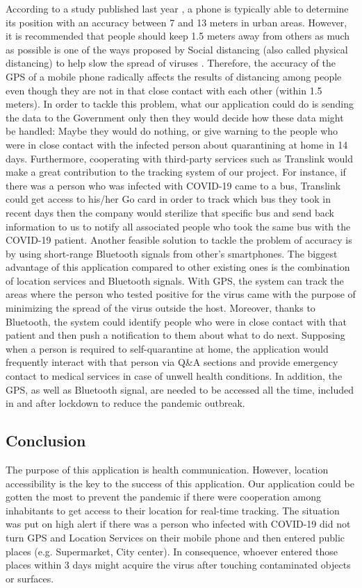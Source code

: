     \par According to a study published last year \parencite{Plan1}, a phone is typically able to determine its position with an accuracy between 7 and 13 meters in urban areas. However, it is recommended that people should keep 1.5 meters away from others as much as possible is one of the ways proposed by Social distancing (also called physical distancing) to help slow the spread of viruses \parencite{Plan2}. Therefore, the accuracy of the GPS of a mobile phone radically affects the results of distancing among people even though they are not in that close contact with each other (within 1.5 meters). In order to tackle this problem, what our application could do is sending the data to the Government only then they would decide how these data might be handled: Maybe they would do nothing, or give warning to the people who were in close contact with the infected person about quarantining at home in 14 days. Furthermore, cooperating with third-party services such as Translink would make a great contribution to the tracking system of our project. For instance, if there was a person who was infected with COVID-19 came to a bus, Translink could get access to his/her Go card in order to track which bus they took in recent days then the company would sterilize that specific bus and send back information to us to notify all associated people who took the same bus with the COVID-19 patient. Another feasible solution to tackle the problem of accuracy is by using short-range Bluetooth signals from other’s smartphones. The biggest advantage of this application compared to other existing ones is the combination of location services and Bluetooth signals. With GPS, the system can track the areas where the person who tested positive for the virus came with the purpose of minimizing the spread of the virus outside the host. Moreover, thanks to Bluetooth, the system could identify people who were in close contact with that patient and then push a notification to them about what to do next. Supposing when a person is required to self-quarantine at home, the application would frequently interact with that person via Q\&A sections and provide emergency contact to medical services in case of unwell health conditions. In addition, the GPS, as well as Bluetooth signal, are needed to be accessed all the time, included in and after lockdown to reduce the pandemic outbreak.
  \subsection{Conclusion}
    \par The purpose of this application is health communication. However, location accessibility is the key to the success of this application. Our application could be gotten the most to prevent the pandemic if there were cooperation among inhabitants to get access to their location for real-time tracking. The situation was put on high alert if there was a person who infected with COVID-19 did not turn GPS and Location Services on their mobile phone and then entered public places (e.g. Supermarket, City center). In consequence, whoever entered those places within 3 days might acquire the virus after touching contaminated objects or surfaces.

